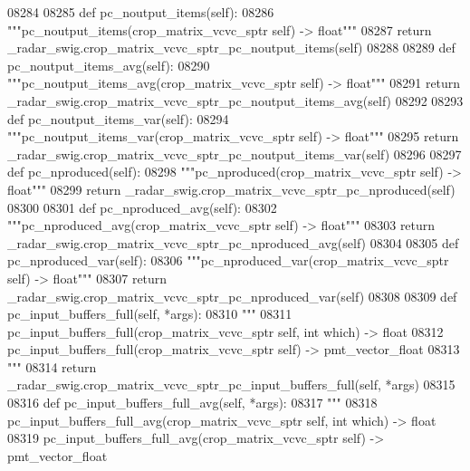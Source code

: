 \begin{DoxyCode}
{{{{{{{{{{{{{{{{{{{{{{{{{{{08284 
08285     \textcolor{keyword}{def }pc_noutput_items(self):
08286         \textcolor{stringliteral}{"""pc\_noutput\_items(crop\_matrix\_vcvc\_sptr self) -> float"""}
08287         \textcolor{keywordflow}{return} \_radar\_swig.crop\_matrix\_vcvc\_sptr\_pc\_noutput\_items(self)
08288 
08289     \textcolor{keyword}{def }pc_noutput_items_avg(self):
08290         \textcolor{stringliteral}{"""pc\_noutput\_items\_avg(crop\_matrix\_vcvc\_sptr self) -> float"""}
08291         \textcolor{keywordflow}{return} \_radar\_swig.crop\_matrix\_vcvc\_sptr\_pc\_noutput\_items\_avg(self)
08292 
08293     \textcolor{keyword}{def }pc_noutput_items_var(self):
08294         \textcolor{stringliteral}{"""pc\_noutput\_items\_var(crop\_matrix\_vcvc\_sptr self) -> float"""}
08295         \textcolor{keywordflow}{return} \_radar\_swig.crop\_matrix\_vcvc\_sptr\_pc\_noutput\_items\_var(self)
08296 
08297     \textcolor{keyword}{def }pc_nproduced(self):
08298         \textcolor{stringliteral}{"""pc\_nproduced(crop\_matrix\_vcvc\_sptr self) -> float"""}
08299         \textcolor{keywordflow}{return} \_radar\_swig.crop\_matrix\_vcvc\_sptr\_pc\_nproduced(self)
08300 
08301     \textcolor{keyword}{def }pc_nproduced_avg(self):
08302         \textcolor{stringliteral}{"""pc\_nproduced\_avg(crop\_matrix\_vcvc\_sptr self) -> float"""}
08303         \textcolor{keywordflow}{return} \_radar\_swig.crop\_matrix\_vcvc\_sptr\_pc\_nproduced\_avg(self)
08304 
08305     \textcolor{keyword}{def }pc_nproduced_var(self):
08306         \textcolor{stringliteral}{"""pc\_nproduced\_var(crop\_matrix\_vcvc\_sptr self) -> float"""}
08307         \textcolor{keywordflow}{return} \_radar\_swig.crop\_matrix\_vcvc\_sptr\_pc\_nproduced\_var(self)
08308 
08309     \textcolor{keyword}{def }pc_input_buffers_full(self, *args):
08310         \textcolor{stringliteral}{"""}
08311 \textcolor{stringliteral}{        pc\_input\_buffers\_full(crop\_matrix\_vcvc\_sptr self, int which) -> float}
08312 \textcolor{stringliteral}{        pc\_input\_buffers\_full(crop\_matrix\_vcvc\_sptr self) -> pmt\_vector\_float}
08313 \textcolor{stringliteral}{        """}
08314         \textcolor{keywordflow}{return} \_radar\_swig.crop\_matrix\_vcvc\_sptr\_pc\_input\_buffers\_full(self, *args)
08315 
08316     \textcolor{keyword}{def }pc_input_buffers_full_avg(self, *args):
08317         \textcolor{stringliteral}{"""}
08318 \textcolor{stringliteral}{        pc\_input\_buffers\_full\_avg(crop\_matrix\_vcvc\_sptr self, int which) -> float}
08319 \textcolor{stringliteral}{        pc\_input\_buffers\_full\_avg(crop\_matrix\_vcvc\_sptr self) -> pmt\_vector\_float}
}}}}}}}}}}}}}}}}}}}}}}}}}}}
\end{DoxyCode}
